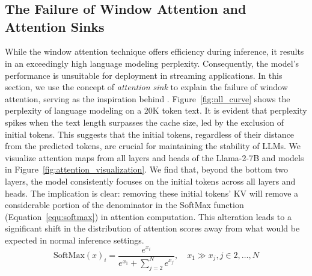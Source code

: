 \vspace{-0.5em}
\section{\method}

\vspace{-0.5em}
\subsection{The Failure of Window Attention and Attention Sinks}
While the window attention technique offers efficiency during inference, it results in an exceedingly high language modeling perplexity. Consequently, the model's performance is unsuitable for deployment in streaming applications. In this section, we use the concept of \emph{attention sink} to explain the failure of window attention, serving as the inspiration behind \method.
\vspace{-1em}
Figure~\ref{fig:nll_curve} shows the perplexity of language modeling on a 20K token text. It is evident that perplexity spikes when the text length surpasses the cache size, led by the exclusion of initial tokens. This suggests that the initial tokens, regardless of their distance from the predicted tokens, are crucial for maintaining the stability of LLMs.
\vspace{-0.5em}
We visualize attention maps from all layers and heads of the Llama-2-7B and models in Figure~\ref{fig:attention_visualization}. We find that, beyond the bottom two layers, the model consistently focuses on the initial tokens across all layers and heads. The implication is clear: removing these initial tokens' KV will remove a considerable portion of the denominator in the SoftMax function (Equation~\ref{equ:softmax}) in attention computation. This alteration leads to a significant shift in the distribution of attention scores away from what would be expected in normal inference settings.
\vspace{-1em}
\begin{equation}
    \text{SoftMax}(x)_i = \frac{e^{x_i}}{e^{x_1} + \sum_{j=2}^{N} e^{x_j}}, \quad x_1 \gg x_j, j \in 2, \dots, N
    \label{equ:softmax}
\end{equation}
\vspace{-1em}

